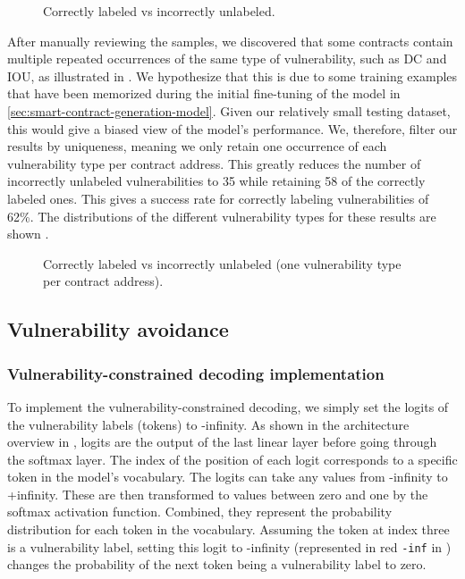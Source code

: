 \documentclass[12pt]{book}
\begin{document}
\begin{figure}[htp]
    \centering
    
    \caption{Correctly labeled vs incorrectly unlabeled.}
    \label{fig:labeled_vs_unlabeled}
\end{figure}

After manually reviewing the samples, we discovered that some contracts contain multiple repeated occurrences of the same type of vulnerability, such as DC and IOU, as illustrated in . We hypothesize that this is due to some training examples that have been memorized during the initial fine-tuning of the model in \cref{sec:smart-contract-generation-model}. Given our relatively small testing dataset, this would give a biased view of the model's performance. We, therefore, filter our results by uniqueness, meaning we only retain one occurrence of each vulnerability type per contract address. This greatly reduces the number of incorrectly unlabeled vulnerabilities to 35 while retaining 58 of the correctly labeled ones. This gives a success rate for correctly labeling vulnerabilities of 62\%. The distributions of the different vulnerability types for these results are shown .

\begin{figure}[htp]
    \centering
    
    \caption{Correctly labeled vs incorrectly unlabeled (one vulnerability type per contract address).}
    \label{fig:unique_labeled_vs_unlabeled}
\end{figure}


\subsection{Vulnerability avoidance}
\label{sec:vulnerability-avoidance}

\subsubsection{Vulnerability-constrained decoding implementation}


To implement the vulnerability-constrained decoding, we simply set the logits of the vulnerability labels (tokens) to -infinity. As shown in the architecture overview in , logits are the output of the last linear layer before going through the softmax layer. The index of the position of each logit corresponds to a specific token in the model's vocabulary. The logits can take any values from -infinity to +infinity. These are then transformed to values between zero and one by the softmax activation function. Combined, they represent the probability distribution for each token in the vocabulary. Assuming the token at index three is a vulnerability label, setting this logit to -infinity (represented in red \lstinline{-inf} in ) changes the probability of the next token being a vulnerability label to zero.
\end{document}
